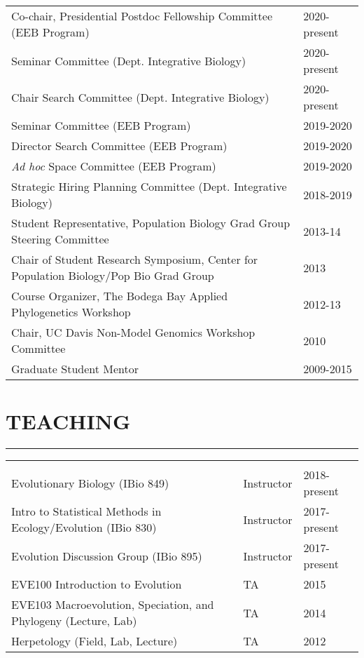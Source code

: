 \documentclass{article}
\begin{document}
\begin{longtable}{>{\everypar{\dohang}\dohang\raggedright\arraybackslash}p{}p{}}
%
Co-chair, Presidential Postdoc Fellowship Committee (EEB Program) & \hfill 2020-present\\
%
Seminar Committee (Dept. Integrative Biology) & \hfill 2020-present\\
%
Chair Search Committee (Dept. Integrative Biology) & \hfill 2020-present\\
%
Seminar Committee (EEB Program) & \hfill 2019-2020\\
%
Director Search Committee (EEB Program) & \hfill 2019-2020\\
%
\emph{Ad hoc} Space Committee (EEB Program) & \hfill 2019-2020\\
%
Strategic Hiring Planning Committee (Dept. Integrative Biology) & \hfill 2018-2019\\
%
%
Student Representative, Population Biology Grad Group Steering Committee & \hfill 2013-14\\
%
Chair of Student Research Symposium, Center for Population Biology/Pop Bio Grad Group & \hfill 2013\\
%
Course Organizer, The Bodega Bay Applied Phylogenetics Workshop & \hfill 2012-13\\
%
Chair, UC Davis Non-Model Genomics Workshop Committee & \hfill 2010\\
%
Graduate Student Mentor & \hfill 2009-2015\\
%
\end{longtable}
%
\section*{TEACHING}
\vspace{-0.6cm}
\rule{470pt}{0.4pt}
%
\begin{tabular}{>{\everypar{\hangindent1cm}}p{}p{}p{}}
\hfill\\
Evolutionary Biology (IBio 849) & Instructor & \hfill 2018-present \\
Intro to Statistical Methods in Ecology/Evolution (IBio 830) & Instructor & \hfill 2017-present \\
Evolution Discussion Group (IBio 895) & Instructor & \hfill 2017-present \\
EVE100 Introduction to Evolution & TA & \hfill 2015	\\
EVE103 Macroevolution, Speciation, and Phylogeny (Lecture, Lab) & TA & \hfill 2014 \\
Herpetology (Field, Lab, Lecture) & TA & \hfill 2012\\
\end{tabular}
%
\end{document}
